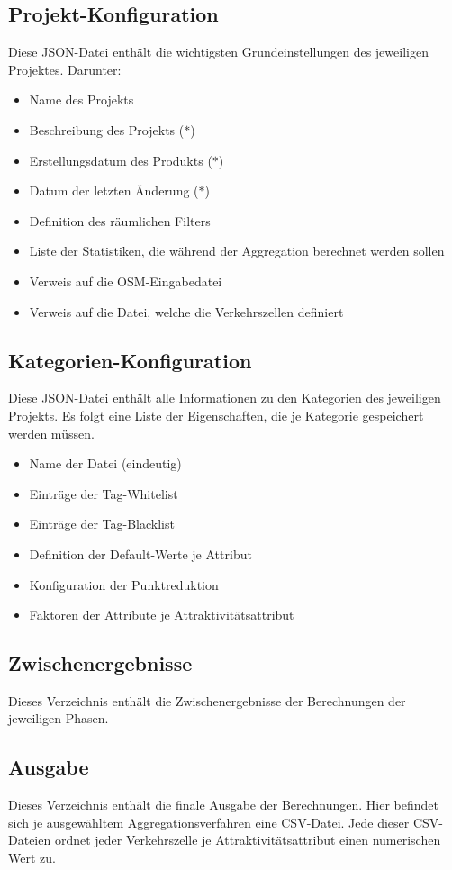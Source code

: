 \documentclass[parskip=full]{scrartcl} %
\begin{document}
\subsection*{Projekt-Konfiguration}
Diese JSON-Datei enthält die wichtigsten Grundeinstellungen des jeweiligen Projektes. Darunter:
\begin{itemize}
    \item Name des Projekts
    \item Beschreibung des Projekts ($\ast$)
    \item Erstellungsdatum des Produkts ($\ast$)
    \item Datum der letzten Änderung ($\ast$)
    \item Definition des räumlichen Filters
    \item Liste der Statistiken, die während der Aggregation berechnet werden sollen
    \item Verweis auf die OSM-Eingabedatei
    \item Verweis auf die Datei, welche die Verkehrszellen definiert
\end{itemize}


\subsection*{Kategorien-Konfiguration}
Diese JSON-Datei enthält alle Informationen zu den Kategorien des jeweiligen Projekts. Es folgt eine Liste der Eigenschaften, die je Kategorie gespeichert werden müssen.
\begin{itemize}
    \item Name der Datei (eindeutig)
    \item Einträge der Tag-Whitelist
    \item Einträge der Tag-Blacklist
    \item Definition der Default-Werte je Attribut
    \item Konfiguration der Punktreduktion
    \item Faktoren der Attribute je Attraktivitätsattribut
\end{itemize}


\subsection*{Zwischenergebnisse}
Dieses Verzeichnis enthält die Zwischenergebnisse der Berechnungen der jeweiligen Phasen.

\subsection*{Ausgabe} \hypertarget{finalresult}{}
Dieses Verzeichnis enthält die finale Ausgabe der Berechnungen. Hier befindet sich je ausgewähltem Aggregationsverfahren eine CSV-Datei. Jede dieser CSV-Dateien ordnet jeder Verkehrszelle je Attraktivitätsattribut einen numerischen Wert zu.
\end{document}
